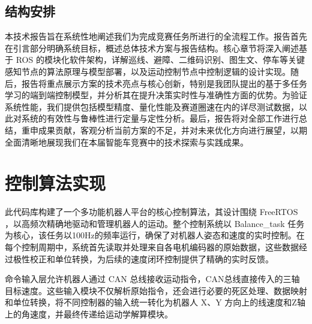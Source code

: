 \documentclass[UTF8]{ctexart}
\begin{document}
\subsection{结构安排}
本技术报告旨在系统性地阐述我们为完成竞赛任务所进行的全流程工作。报告首先在引言部分明确系统目标，概述总体技术方案与报告结构。核心章节将深入阐述基于 ROS 的模块化软件架构，详解巡线、避障、二维码识别、图生文、停车等关键感知节点的算法原理与模型部署，以及运动控制节点中控制逻辑的设计实现。随后，报告将重点展示方案的技术亮点与核心创新，特别是我团队提出的基于多任务学习的端到端控制模型，并分析其在提升决策实时性与准确性方面的优势。为验证系统性能，我们提供包括模型精度、量化性能及赛道圈速在内的详尽测试数据，以此对系统的有效性与鲁棒性进行定量与定性分析。最后，报告将对全部工作进行总结，重申成果贡献，客观分析当前方案的不足，并对未来优化方向进行展望，以期全面清晰地展现我们在本届智能车竞赛中的技术探索与实践成果。

\section{控制算法实现}
此代码库构建了一个多功能机器人平台的核心控制算法，其设计围绕 FreeRTOS ，以高频次精确地驱动和管理机器人的运动。整个控制系统以 Balance\_task 任务为核心，该任务以100Hz的频率运行，确保了对机器人姿态和速度的实时控制。在每个控制周期中，系统首先读取并处理来自各电机编码器的原始数据，这些数据经过极性校正和单位转换，为后续的速度闭环控制提供了精确的实时反馈。

命令输入层允许机器人通过 CAN 总线接收运动指令，CAN总线直接传入的三轴目标速度。这些输入模块不仅解析原始指令，还会进行必要的死区处理、数据映射和单位转换，将不同控制器的输入统一转化为机器人 X、Y 方向上的线速度和Z轴上的角速度，并最终传递给运动学解算模块。
\end{document}
